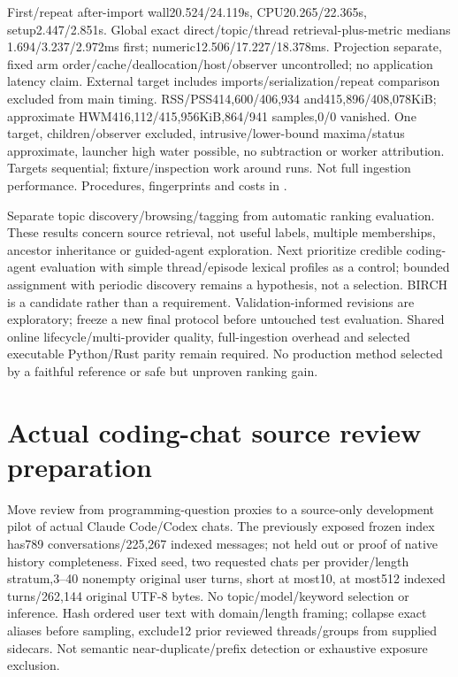 \documentclass[11pt]{article}
\begin{document}
First/repeat after-import wall20.524/24.119s, CPU20.265/22.365s,
setup2.447/2.851s. Global exact direct/topic/thread retrieval-plus-metric medians
1.694/3.237/2.972ms first; numeric12.506/17.227/18.378ms. Projection separate,
fixed arm order/cache/deallocation/host/observer uncontrolled; no application
latency claim. External target includes imports/serialization/repeat comparison
excluded from main timing. RSS/PSS414,600/406,934 and415,896/408,078KiB;
approximate HWM416,112/415,956KiB,864/941 samples,0/0 vanished. One target,
children/observer excluded, intrusive/lower-bound maxima/status approximate,
launcher high water possible, no subtraction or worker attribution. Targets
sequential; fixture/inspection work around runs. Not full ingestion performance.
Procedures, fingerprints and costs in
.

Separate topic discovery/browsing/tagging from automatic ranking evaluation.
These results concern source retrieval, not useful labels, multiple memberships,
ancestor inheritance or guided-agent exploration. Next prioritize credible
coding-agent evaluation with simple thread/episode lexical profiles as a control;
bounded assignment with periodic discovery remains a hypothesis, not a selection.
BIRCH is a candidate rather than a requirement. Validation-informed revisions
are exploratory; freeze a new final protocol before untouched test evaluation.
Shared online lifecycle/multi-provider quality, full-ingestion overhead and
selected executable Python/Rust parity remain required. No production method
selected by a faithful reference or safe but unproven ranking gain.

\section{Actual coding-chat source review preparation}
Move review from programming-question proxies to a source-only development
pilot of actual Claude Code/Codex chats. The previously exposed frozen index
has789 conversations/225,267 indexed messages; not held out or proof of native
history completeness. Fixed seed, two requested chats per provider/length
stratum,3--40 nonempty original user turns, short at most10, at most512 indexed
turns/262,144 original UTF-8 bytes. No topic/model/keyword selection or inference.
Hash ordered user text with domain/length framing; collapse exact aliases before
sampling, exclude12 prior reviewed threads/groups from supplied sidecars.
Not semantic near-duplicate/prefix detection or exhaustive exposure exclusion.
\end{document}
